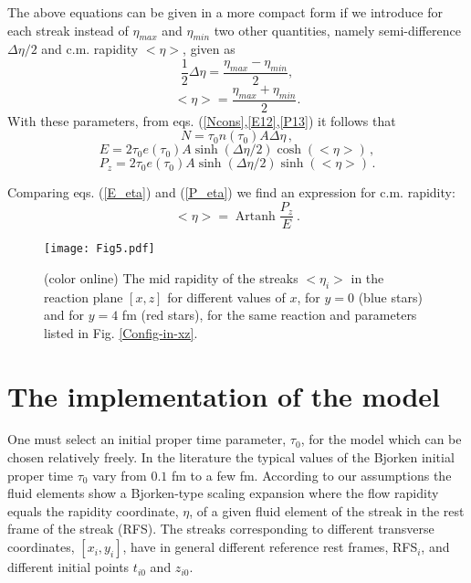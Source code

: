 \documentclass[aps,prc,twocolumn,floatfix,showpacs,a4paper,
nofootinbib,amsmath,amssymb]{revtex4-1}
\newcommand{\be}{\begin{equation}}
\newcommand{\ee}{\end{equation}}
\DeclareMathOperator{\Artanh}{Artanh}
\begin{document}
The above equations can be given in a more compact form if we introduce for each streak instead of $\eta_{max}$ and  $\eta_{min}$ two other quantities, namely
semi-difference $\Delta \eta/2$ and c.m. rapidity $<\eta>$, given as
\be
\frac{1}{2}\Delta \eta = 
\frac{\eta_{max}-\eta_{min}}{2}  ,
\ee
\be
<\eta > = 
\frac{\eta_{max}+\eta_{min}}{2} .
\ee 
With these parameters, from eqs. (\ref{Ncons},\ref{E12},\ref{P13}) 
it follows that 
\be
N = \tau_0 n(\tau_0) A \Delta \eta \,,
\label{N_eta}
\ee
\be
E = 2 \tau_0 e(\tau_0) A \sinh(\Delta \eta/2) \cosh(<\eta>)
\,,
\label{E_eta}
\ee
\be
P_{z} = 2 \tau_0 e(\tau_0) A \sinh(\Delta \eta/2) \sinh(<\eta>)
\,. 
\label{P_eta}
\ee

Comparing eqs.  (\ref{E_eta}) and  (\ref{P_eta}) we find an expression for c.m. rapidity:
\be
<\eta> = 
\Artanh \frac{P_{z}}{E}\ .
\label{eta}
\ee




%
\begin{figure}[htb]     %
\begin{center}
\resizebox{1.01\columnwidth}{!}
{\texttt{[image: Fig5.pdf]}}
\caption{ (color online)
The mid rapidity of the streaks $<\eta_i>$ in the reaction 
plane $[x,z]$  for different values of $x$, for $y=0$
(blue stars) and for $y=4$ fm (red stars),
for the same reaction and parameters listed in Fig. \ref{Config-in-xz}.
}
\label{eta-i}
\end{center}
\end{figure}        %
%






\section{The implementation of the model}
\label{sec3}



One must select an initial proper time parameter, $\tau_0$,  for the model
which  can be chosen relatively freely.
In the literature the typical values of the Bjorken initial proper time $\tau_0$
vary from $0.1$ fm to a few fm. 
According to our assumptions the fluid elements  show a Bjorken-type  scaling expansion where the flow rapidity equals the rapidity coordinate, $\eta$,
of a given fluid element of the streak in the rest frame
of the streak (RFS).
The streaks corresponding to different transverse coordinates, $[x_i,y_i]$, have in general different reference rest frames, RFS$_i$, and different
initial points $t_{i0}$ and $z_{i0}$.
\end{document}
